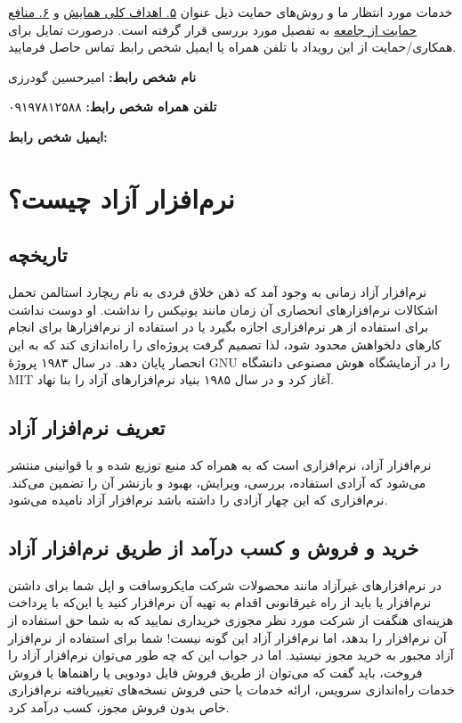 \documentclass{article}
\begin{document}
\begin{flushright}
خدمات مورد انتظار ما و روش‌های حمایت ذیل عنوان \underline{۵. اهداف کلی همایش} و \underline{۶. منافع حمایت از جامعه} به تفصیل مورد بررسی قرار گرفته است. درصورت تمایل برای همکاری/حمایت از این رویداد با تلفن همراه یا ایمیل شخص رابط تماس حاصل فرمایید.

\textbf{نام شخص رابط:} امیرحسین گودرزی

\textbf{تلفن همراه شخص رابط:} ۰۹۱۹۷۸۱۲۵۸۸

\textbf{ایمیل شخص رابط:} 

\end{flushright}

\section{نرم‌افزار آزاد چیست؟}
\subsection{تاریخچه}
نرم‌افزار آزاد زمانی به وجود آمد که ذهن خلاق فردی به نام ریچارد استالمن تحمل اشکالات نرم‌افزارهای انحصاری آن زمان مانند یونیکس را نداشت. او دوست نداشت برای استفاده از هر نرم‌افزاری اجازه بگیرد یا در استفاده از نرم‌افزارها برای انجام کار‌های دلخواهش محدود شود، لذا تصمیم گرفت پروژه‌ای را راه‌اندازی کند که به این انحصار پایان دهد. در سال ۱۹۸۳ پروژهٔ GNU را در آزمایشگاه هوش مصنوعی دانشگاه MIT آغاز کرد و در سال ۱۹۸۵ بنیاد نرم‌افزار‌های آزاد را بنا نهاد.
\subsection{تعریف نرم‌افزار آزاد}
نرم‌افزار آزاد، نرم‌افزاری است که به همراه کد منبع توزیع شده و با قوانینی منتشر می‌شود که آزادی استفاده، بررسی، ویرایش، بهبود و بازنشر آن را تضمین می‌کند. نرم‌افزاری که این چهار آزادی را داشته باشد نرم‌افزار آزاد نامیده می‌شود.
\subsection{خرید و فروش و کسب درآمد از طریق نرم‌افزار آزاد}

در نرم‌افزارهای غیرآزاد مانند محصولات شرکت مایکروسافت و اپل شما برای داشتن نرم‌افزار یا باید از راه غیر‌قانونی اقدام به تهیه آن نرم‌افزار کنید یا این‌که با پرداخت هزینه‌ای هنگفت از شرکت مورد نظر مجوزی خریداری نمایید که به شما حق استفاده از آن نرم‌افزار را بدهد، اما نرم‌افزار آزاد این گونه نیست! شما برای استفاده از نرم‌افزار آزاد مجبور به خرید مجوز نیستید. اما در جواب این که چه طور می‌توان نرم‌افزار آزاد را فروخت، باید گفت که می‌توان از طریق فروش فایل دودویی یا راهنما‌ها یا فروش خدمات راه‌اندازی سرویس، ارائه خدمات یا حتی فروش نسخه‌های تغییر‌یافته نرم‌افزاری خاص بدون فروش مجوز، کسب در‌آمد کرد.
\end{document}
